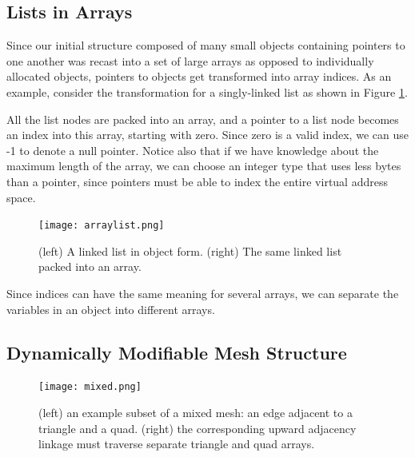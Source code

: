 \subsection{Lists in Arrays}
\label{sec:lia}

Since our initial structure composed of many small objects containing pointers
to one another was recast into a set of large arrays
as opposed to individually allocated objects,
pointers to objects get transformed into array indices.
As an example, consider the transformation for a singly-linked
list as shown in Figure \ref{fig:arraylist}.

All the list nodes are packed into an array, and a pointer to
a list node becomes an index into this array, starting with zero.
Since zero is a valid index, we can use -1 to denote a null pointer.
Notice also that if we have knowledge about the maximum length
of the array, we can choose an integer type that uses less bytes
than a pointer, since pointers must be able to index the entire
virtual address space.

\begin{figure}
\begin{center}
\texttt{[image: arraylist.png]}
\caption{(left) A linked list in object form.
(right) The same linked list packed into an array.}
\label{fig:arraylist}
\end{center}
\end{figure}

Since indices can have the same meaning for several arrays,
we can separate the variables in an object into different
arrays.

\subsection{Dynamically Modifiable Mesh Structure}
\label{sec:sisc_mstruct}

\begin{figure}
\begin{center}
\texttt{[image: mixed.png]}
\caption{(left) an example subset of a mixed mesh:
an edge adjacent to a triangle and a quad.
(right) the corresponding upward adjacency linkage
must traverse separate triangle and quad arrays.}
\label{fig:mixed}
\end{center}
\end{figure}

